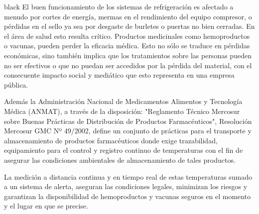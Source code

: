 \documentclass[11pt]{charter}
\begin{document}
\begin{consigna}{black}
El buen funcionamiento de los sistemas de refrigeración es afectado a menudo por cortes de energía, mermas en el rendimiento del equipo compresor, o pérdidas en el sello ya sea por desgaste de burletes o puertas no bien cerradas.
En el área de salud esto resulta crítico. Productos medicinales como hemoproductos o vacunas, pueden perder la eficacia médica. Esto no sólo se traduce en pérdidas económicas, sino también implica que los tratamientos sobre las personas pueden no ser efectivos o que no puedan ser accedidos por la pérdida del material, con el consecuente impacto social y mediático que esto representa en una empresa pública. 

Además la Administración Nacional de Medicamentos Alimentos y Tecnología Médica (ANMAT), a través de la disposición: "Reglamento Técnico Mercosur sobre Buenas Prácticas de Distribución de Productos Farmacéuticos", Resolución Mercosur GMC Nº 49/2002, define un conjunto de prácticas para el transporte y almacenamiento de productos farmacéuticos donde exige trazabilidad, equipamiento para el control y registro continuo de temperaturas con el fin de asegurar las condiciones ambientales de almacenamiento de tales productos. 

La medición a distancia continua y en tiempo real de estas temperaturas sumado a un sistema de alerta, aseguran las condiciones legales, minimizan los riesgos y garantizan la disponibilidad de hemoproductos y vacunas seguros en el momento y el lugar en que se precise. 


\end{consigna}
\end{document}
